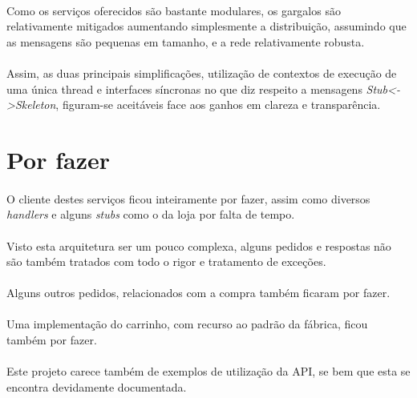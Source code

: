 \documentclass[11pt,a4paper]{report}
\begin{document}
\paragraph{} Como os serviços oferecidos são bastante modulares, os gargalos são relativamente mitigados aumentando simplesmente a distribuição, assumindo que as mensagens são pequenas em tamanho, e a rede relativamente robusta.

\paragraph{} Assim, as duas principais simplificações, utilização de contextos de execução de uma única thread e interfaces síncronas no que diz respeito a mensagens \textit{Stub<->Skeleton}, figuram-se aceitáveis face aos ganhos em clareza e transparência.

\section{Por fazer}

\paragraph{} O cliente destes serviços ficou inteiramente por fazer, assim como diversos \textit{handlers} e alguns \textit{stubs} como o da loja por falta de tempo.

\paragraph{} Visto esta arquitetura ser um pouco complexa, alguns pedidos e respostas não são também tratados com todo o rigor e tratamento de exceções.

\paragraph{} Alguns outros pedidos, relacionados com a compra também ficaram por fazer.

\paragraph{} Uma implementação do carrinho, com recurso ao padrão da fábrica, ficou também por fazer.

\paragraph{} Este projeto carece também de exemplos de utilização da API, se bem que esta se encontra devidamente documentada.
\end{document}
